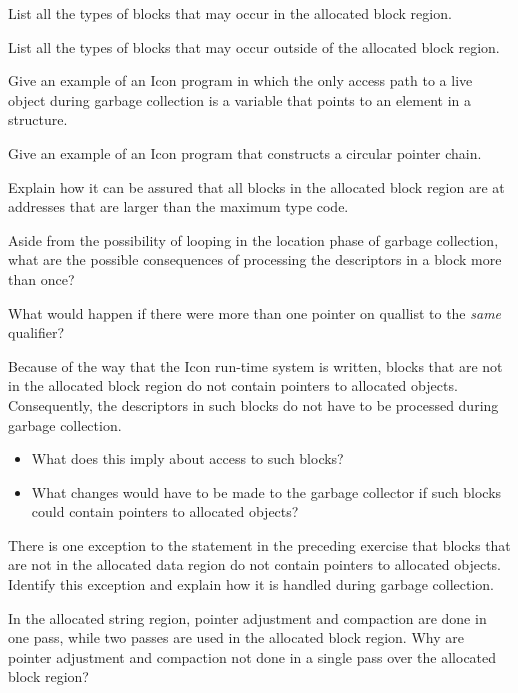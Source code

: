  List all the types of blocks that may occur in
the allocated block region.

 List all the types of blocks that may occur
outside of the allocated block region.

 Give an example of an Icon program in which the
only access path to a live object during garbage collection is a
variable that points to an element in a structure.

 Give an example of an Icon program that
constructs a circular pointer chain.

 Explain how it can be assured that all blocks in
the allocated block region are at addresses that are larger than the
maximum type code.

 Aside from the possibility of looping in the
location phase of garbage collection, what are the possible
consequences of processing the descriptors in a block more than once?

 What would happen if there were more than one
pointer on quallist to the \textit{same} qualifier?

 Because of the way that the Icon run-time system
is written, blocks that are not in the allocated block region do not
contain pointers to allocated objects. Consequently, the descriptors
in such blocks do not have to be processed during garbage collection.

\begin{itemize}
\item What does this imply about access to such blocks?

\item What changes would have to be made to the garbage collector if
such blocks could contain pointers to allocated objects?

\end{itemize}

 There is one exception to the statement in the
preceding exercise that blocks that are not in the allocated data
region do not contain pointers to allocated objects. Identify this
exception and explain how it is handled during garbage collection.

 In the allocated string region, pointer
adjustment and compaction are done in one pass, while two passes are
used in the allocated block region. Why are pointer adjustment and
compaction not done in a single pass over the allocated block region?

